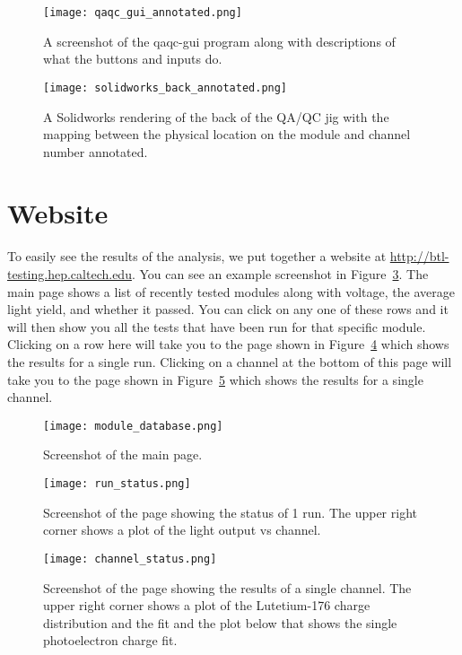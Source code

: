 \documentclass[12pt,openright,twoside]{report}
\begin{document}
\begin{figure}
\centering
\texttt{[image: qaqc\_gui\_annotated.png]}
\caption{A screenshot of the qaqc-gui program along with descriptions of what the buttons and inputs do.}
\label{fig:qaqc-gui-annotated}
\end{figure}

\begin{figure}
\centering
\texttt{[image: solidworks\_back\_annotated.png]}
\caption{A Solidworks rendering of the back of the QA/QC jig with the mapping between the physical location on the module and channel number annotated.}
\label{fig:solidworks-back-annotated}
\end{figure}

\section{Website}
\label{sec:website}
To easily see the results of the analysis, we put together a website at
\url{http://btl-testing.hep.caltech.edu}. You can see an example screenshot in
Figure~\ref{fig:module-database}. The main page shows a list of recently tested
modules along with voltage, the average light yield, and whether it passed. You
can click on any one of these rows and it will then show you all the tests that
have been run for that specific module. Clicking on a row here will take you to
the page shown in Figure~\ref{fig:run-status} which shows the results for a
single run. Clicking on a channel at the bottom of this page will take you to
the page shown in Figure~\ref{fig:channel-status} which shows the results for a
single channel.

\begin{figure}
\centering
\texttt{[image: module\_database.png]}
\caption{Screenshot of the main page.}
\label{fig:module-database}
\end{figure}

\begin{figure}
\centering
\texttt{[image: run\_status.png]}
\caption[Screenshot of the page showing the status of 1 run.]{Screenshot of the page showing the status of 1 run. The upper right corner shows a plot of the light output vs channel.}
\label{fig:run-status}
\end{figure}

\begin{figure}
\centering
\texttt{[image: channel\_status.png]}
\caption{Screenshot of the page showing the results of a single channel. The upper right corner shows a plot of the Lutetium-176 charge distribution and the fit and the plot below that shows the single photoelectron charge fit.}
\label{fig:channel-status}
\end{figure}
\end{document}
